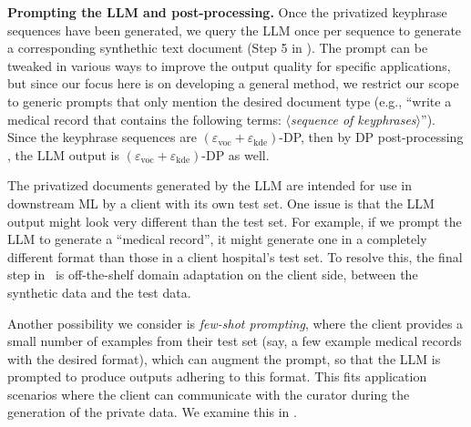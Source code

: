 \noindent\textbf{Prompting the LLM and post-processing.}
Once the privatized keyphrase sequences have been generated, we query the LLM once per sequence to generate a corresponding synthethic text document (Step 5 in ). The prompt can be tweaked in various ways to improve the output quality for specific applications, but since our focus here is on developing a general method, we restrict our scope to generic prompts that only mention the desired document type (e.g., ``write a medical record that contains the following terms: $\langle$\textit{sequence of keyphrases}$\rangle$''). Since the keyphrase sequences are $(\varepsilon_{\mathrm{voc}}+\varepsilon_{\mathrm{kde}})$-DP, then by DP post-processing \cite{dwork2014algorithmic}, the LLM output is $(\varepsilon_{\mathrm{voc}}+\varepsilon_{\mathrm{kde}})$-DP as well.

The privatized documents generated by the LLM are intended for use in downstream ML by a client with its own test set. 
One issue is that the LLM output might look very different than the test set. For example, if we prompt the LLM to generate a ``medical record'', it might generate one in a completely different format than those in a client hospital's test set.
%
To resolve this, the final step in \alg\ is off-the-shelf domain adaptation on the client side, between the synthetic data and the test data. 

Another possibility we consider is \emph{few-shot prompting}, where the client provides a small number of examples from their test set (say, a few example medical records with the desired format), which can augment the prompt, so that the LLM is prompted to produce outputs adhering to this format. This fits application scenarios where the client can communicate with the curator during the generation of the private data. We examine this in .



